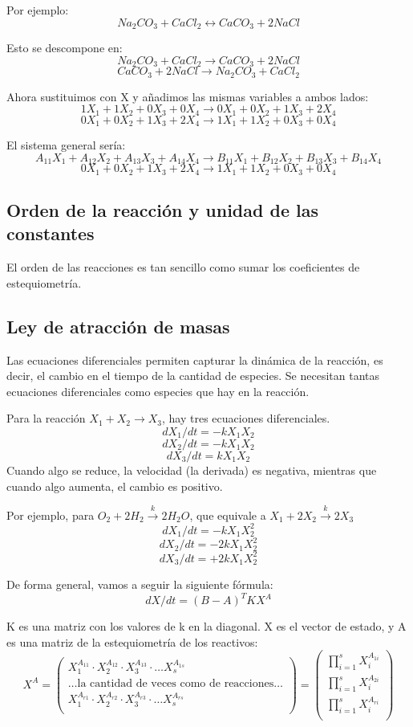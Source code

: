 Por ejemplo:
$$Na_2CO_3 + CaCl_2 \leftrightarrow CaCO_3 + 2NaCl$$

Esto se descompone en:
$$Na_2CO_3 + CaCl_2 \rightarrow CaCO_3 + 2NaCl$$
$$CaCO_3 + 2NaCl \rightarrow Na_2CO_3 + CaCl_2 $$

Ahora sustituimos con X y añadimos las mismas variables a ambos lados:
$$1X_1 + 1X_2 + 0X_3 + 0X_4 \rightarrow 0X_1 + 0X_2 + 1X_3 + 2X_4$$
$$0X_1 + 0X_2 + 1X_3 + 2X_4 \rightarrow 1X_1 + 1X_2 + 0X_3 + 0X_4$$

El sistema general sería:
$$A_{11}X_1 + A_{12}X_2 + A_{13}X_3 + A_{14}X_4 \rightarrow B_{11}X_1 + B_{12}X_2 + B_{13}X_3 + B_{14}X_4$$
$$0X_1 + 0X_2 + 1X_3 + 2X_4 \rightarrow 1X_1 + 1X_2 + 0X_3 + 0X_4$$

\subsection{Orden de la reacción y unidad de las constantes}
El orden de las reacciones es tan sencillo como sumar los coeficientes de estequiometría.

\subsection{Ley de atracción de masas}
Las ecuaciones diferenciales permiten capturar la dinámica de la reacción, es decir, el cambio en el tiempo de la cantidad de especies. Se necesitan tantas ecuaciones diferenciales como especies que hay en la reacción. 

Para la reacción $X_1 + X_2 \rightarrow X_3$, hay tres ecuaciones diferenciales.
$$dX_1/dt = -k X_1X_2$$
$$dX_2/dt = -k X_1X_2$$
$$dX_3/dt = k X_1X_2$$
Cuando algo se reduce, la velocidad (la derivada) es negativa, mientras que cuando algo aumenta, el cambio es positivo.

Por ejemplo, para $O_2 + 2 H_2 \xrightarrow{k} 2 H_2O$, que equivale a $X_1 + 2 X_2 \xrightarrow{k} 2 X_3$
$$dX_1/dt = -k X_1 X_2^2$$
$$dX_2/dt = -2k X_1 X_2^2$$
$$dX_3/dt = +2k X_1 X_2^2$$

De forma general, vamos a seguir la siguiente fórmula:
$$dX/dt = (B - A)^T K X^A$$

K es una matriz con los valores de k en la diagonal. X es el vector de estado, y A es una matriz de la estequiometría de los reactivos:
$$X^A = \begin{pmatrix}
X_1^{A_{11}} \cdot X_2^{A_{12}} \cdot X_3^{A_{13}} \cdot \ldots X_s^{A_{1s}} \\
\ldots \text{la cantidad de veces como de reacciones} \ldots \\
X_1^{A_{r1}} \cdot X_2^{A_{r2}} \cdot X_3^{A_{r3}} \cdot \ldots X_s^{A_{rs}} \\
\end{pmatrix} = \begin{pmatrix}
\prod^s_{i = 1} X_i^{A_{1i}} \\
\prod^s_{i = 1} X_i^{A_{2i}} \\
\prod^s_{i = 1} X_i^{A_{ri}} \\
\end{pmatrix}$$

